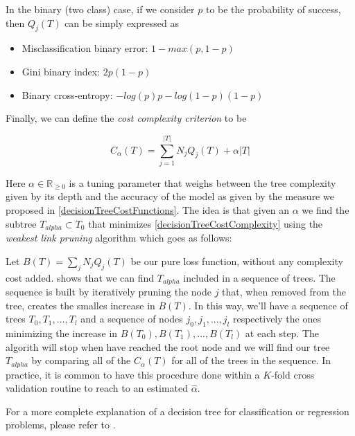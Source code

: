 In the binary (two class) case, if we consider $p$ to be the probability of success, then $Q_j(T)$ can be simply expressed as

\begin{itemize}
	\item Misclassification binary error: $1 - max(p, 1-p)$
	\item Gini binary index: $ 2p(1-p) $
	\item Binary cross-entropy: $ -log(p)p - log(1- p)(1-p) $
\end{itemize}\label{decisionTreeCostFunctions}

Finally, we can define the \textit{cost complexity criterion} to be 

\begin{equation}
C_\alpha(T)  = \sum_{j=1}^{|T|} N_j Q_j(T)  + \alpha|T| 
\end{equation}\label{decisionTreeCostComplexity}

Here  $\alpha \in \mathbb{R}_{\geq 0}$ is a tuning parameter that weighs between the tree complexity given by its depth and the accuracy of the model as given by the measure we proposed in \ref{decisionTreeCostFunctions}. The idea is that given an $\alpha$ we find the subtree $T_{alpha} \subset T_0$ that minimizes \ref{decisionTreeCostComplexity} using the \textit{weakest link pruning} algorithm which goes as follows:

Let  $B(T)  = \sum_{j} N_j Q_j(T) $ be our pure loss function, without any complexity cost added. \cite{breiman-cart84} shows that we can find $T_{alpha}$ included in a sequence of trees. The sequence is built by iteratively pruning the node $j$ that, when removed from the tree, creates the smalles increase in $B(T)$. In this way, we'll have a sequence of trees $T_0,T_1,...,T_l$ and a sequence of nodes $j_0, j_1,...,j_l$ respectively the ones minimizing the increase in $B(T_0),B(T_1),...,B(T_l)$ at each step. The algorith will stop when have reached the root node and we will find our tree $T_{alpha}$ by comparing all of the $C_\alpha(T)$ for all of the trees in the sequence. In practice, it is common to have this procedure done within a $K$-fold cross validation routine to reach to an estimated $\hat{\alpha}$.

For a more complete explanation of a decision tree for classification or regression problems, please refer to \cite{breiman-cart84}.


\textit{}

\textit{}

\textit{}

